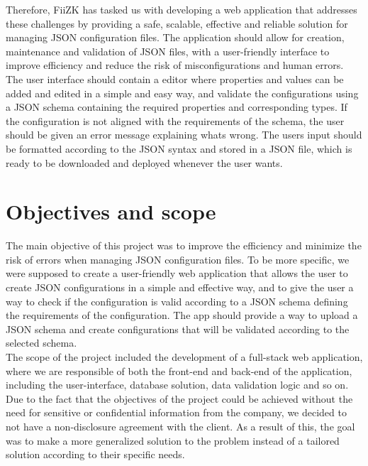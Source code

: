 \noindent
Therefore, FiiZK has tasked us with developing a web application that addresses these challenges by providing a safe, scalable, effective and reliable solution for managing JSON configuration files. The application should allow for creation, maintenance and validation of JSON files, with a user-friendly interface to improve efficiency and reduce the risk of misconfigurations and human errors. The user interface should contain a editor where properties and values can be added and edited in a simple and easy way, and validate the configurations using a JSON schema containing the required properties and corresponding types. If the configuration is not aligned with the requirements of the schema, the user should be given an error message explaining whats wrong. The users input should be formatted according to the JSON syntax and stored in a JSON file, which is ready to be downloaded and deployed whenever the user wants. \\

\section{Objectives and scope}

The main objective of this project was to improve the efficiency and minimize the risk of errors when managing JSON configuration files. To be more specific, we were supposed to create a user-friendly web application that allows the user to create JSON configurations in a simple and effective way, and to give the user a way to check if the configuration is valid according to a JSON schema defining the requirements of the configuration. The app should provide a way to upload a JSON schema and create configurations that will be validated according to the selected schema. \\


\noindent
The scope of the project included the development of a full-stack web application, where we are responsible of both the front-end and back-end of the application, including the user-interface, database solution, data validation logic and so on. Due to the fact that the objectives of the project could be achieved without the need for sensitive or confidential information from the company, we decided to not have a non-disclosure agreement with the client. As a result of this, the goal was to make a more generalized solution to the problem instead of a tailored solution according to their specific needs. \\


